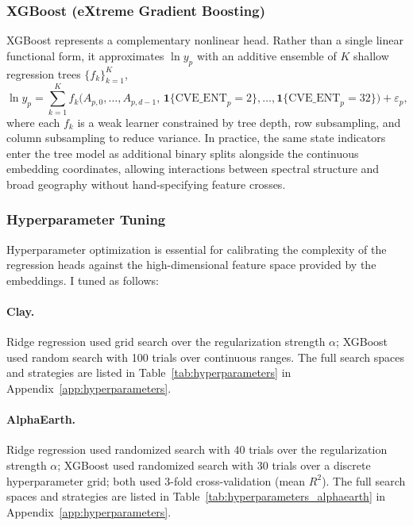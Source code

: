 \documentclass[12pt,letterpaper]{article}
\begin{document}
\subsubsection{XGBoost (eXtreme Gradient Boosting)}
\label{subsub:xgboost}
XGBoost represents a complementary nonlinear head. Rather than a single linear functional form, it approximates $\ln y_p$ with an additive ensemble of $K$ shallow regression trees $\{f_k\}_{k=1}^{K}$,
\begin{equation}
\label{eq:xgb_prediction_head}
\ln y_p
  = \sum_{k=1}^{K} f_k\bigl(A_{p,0},\ldots,A_{p,d-1},\,\textbf{1}\{\mathrm{CVE\_ENT}_p=2\},\ldots,\textbf{1}\{\mathrm{CVE\_ENT}_p=32\}\bigr) + \varepsilon_p ,
\end{equation}
where each $f_k$ is a weak learner constrained by tree depth, row subsampling, and column subsampling to reduce variance. In practice, the same state indicators enter the tree model as additional binary splits alongside the continuous embedding coordinates, allowing interactions between spectral structure and broad geography without hand-specifying feature crosses.

\subsubsection{Hyperparameter Tuning}
Hyperparameter optimization is essential for calibrating the complexity of the regression heads against the high-dimensional feature space provided by the embeddings. I tuned as follows:

\paragraph{Clay.} Ridge regression used grid search over the regularization strength $\alpha$; XGBoost used random search with 100 trials over continuous ranges. The full search spaces and strategies are listed in Table~\ref{tab:hyperparameters} in Appendix~\ref{app:hyperparameters}.

\paragraph{AlphaEarth.} Ridge regression used randomized search with 40 trials over the regularization strength $\alpha$; XGBoost used randomized search with 30 trials over a discrete hyperparameter grid; both used 3-fold cross-validation (mean $R^2$). The full search spaces and strategies are listed in Table~\ref{tab:hyperparameters_alphaearth} in Appendix~\ref{app:hyperparameters}.
\end{document}
